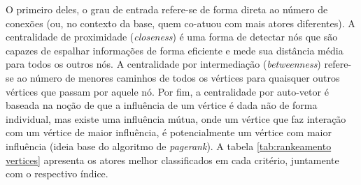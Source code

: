 O primeiro deles, o grau de entrada refere-se de forma direta ao número de conexões (ou, no contexto da base, quem co-atuou com mais atores diferentes). A centralidade de proximidade (\textit{closeness}) é uma forma de detectar nós que são capazes de espalhar informações de forma eficiente e mede sua distância média para todos os outros nós. A centralidade por intermediação (\textit{betweenness}) refere-se ao número de menores caminhos de todos os vértices para quaisquer outros vértices que passam por aquele nó. Por fim, a centralidade por auto-vetor é baseada na noção de que a influência de um vértice é dada não de forma individual, mas existe uma influência mútua, onde um vértice que faz interação com um vértice de maior influência, é potencialmente um vértice com maior influência (ideia base do algoritmo de \textit{pagerank}). A tabela \ref{tab:rankeamento vertices} apresenta os atores melhor classificados em cada critério, juntamente com o respectivo índice.

